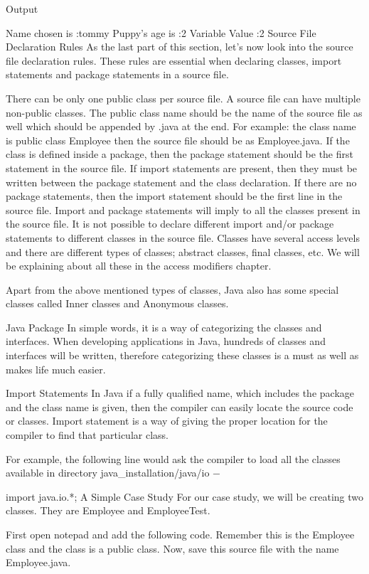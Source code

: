 Output

Name chosen is :tommy
Puppy's age is :2
Variable Value :2
Source File Declaration Rules
As the last part of this section, let's now look into the source file declaration rules. These rules are essential when declaring classes, import statements and package statements in a source file.

There can be only one public class per source file.
A source file can have multiple non-public classes.
The public class name should be the name of the source file as well which should be appended by .java at the end. For example: the class name is public class Employee{} then the source file should be as Employee.java.
If the class is defined inside a package, then the package statement should be the first statement in the source file.
If import statements are present, then they must be written between the package statement and the class declaration. If there are no package statements, then the import statement should be the first line in the source file.
Import and package statements will imply to all the classes present in the source file. It is not possible to declare different import and/or package statements to different classes in the source file.
Classes have several access levels and there are different types of classes; abstract classes, final classes, etc. We will be explaining about all these in the access modifiers chapter.

Apart from the above mentioned types of classes, Java also has some special classes called Inner classes and Anonymous classes.

Java Package
In simple words, it is a way of categorizing the classes and interfaces. When developing applications in Java, hundreds of classes and interfaces will be written, therefore categorizing these classes is a must as well as makes life much easier.

Import Statements
In Java if a fully qualified name, which includes the package and the class name is given, then the compiler can easily locate the source code or classes. Import statement is a way of giving the proper location for the compiler to find that particular class.

For example, the following line would ask the compiler to load all the classes available in directory java_installation/java/io −

import java.io.*;
A Simple Case Study
For our case study, we will be creating two classes. They are Employee and EmployeeTest.

First open notepad and add the following code. Remember this is the Employee class and the class is a public class. Now, save this source file with the name Employee.java.

